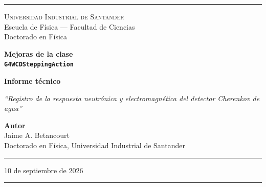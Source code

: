 \documentclass[11pt,a4paper]{article}
\begin{document}
\pagestyle{empty}


\begin{titlepage}
\begin{center}

\vspace*{0.5cm}
\textcolor{reglaColor}{\rule{\linewidth}{1.2pt}}

\vspace{1.3cm}
{\Large\scshape Universidad Industrial de Santander}\\[0.2cm]
{\large Escuela de Física --- Facultad de Ciencias}\\[0.2cm]
{\large Doctorado en Física}

\vspace{2.2cm}
{\Huge\bfseries\color{tituloColor} Mejoras de la clase\\[0.2cm]
\texttt{G4WCDSteppingAction}}

\vspace{1.8cm}
{\large\textbf{Informe técnico}}

\vspace{0.6cm}
\begin{minipage}{0.82\linewidth}
\centering
\textit{``Registro de la respuesta neutrónica y electromagnética del detector Cherenkov de agua''}
\end{minipage}

\vfill

{\large\textbf{Autor}}\\[0.15cm]
Jaime A. Betancourt\\[0.1cm]
Doctorado en Física, Universidad Industrial de Santander

\vspace{1.2cm}
\textcolor{reglaColor}{\rule{0.5\linewidth}{0.6pt}}

\vspace{1cm}
10 de septiembre de 2026

\vspace{1cm}
\textcolor{reglaColor}{\rule{\linewidth}{1.2pt}}

\end{center}
\end{titlepage}

\pagestyle{plain}
\end{document}

